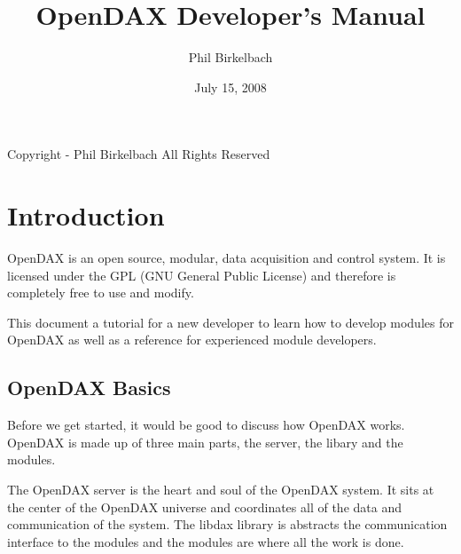 \documentclass[10pt,letterpaper]{report}
\title{OpenDAX Developer's Manual}
\date{July 15, 2008}
\author{Phil Birkelbach}
\begin{document}
\begin{titlepage}
\maketitle

\begin{flushleft}
Copyright  - Phil Birkelbach\linebreak
All Rights Reserved
\end{flushleft}

\end{titlepage}
\tableofcontents
\newpage

\chapter{Introduction}
OpenDAX is an open source, modular, data acquisition and control system. It is licensed under the GPL (GNU General Public License) and therefore is completely free to use and modify.

This document a tutorial for a new developer to learn how to develop modules for OpenDAX as well as a reference for experienced module developers.




\section{OpenDAX Basics}
Before we get started, it would be good to discuss how OpenDAX works.  OpenDAX is made up of three main parts, the server, the libary and the modules.

The OpenDAX server is the heart and soul of the OpenDAX system.  It sits at the center of the OpenDAX universe and coordinates all of the data and communication of the system.  The libdax library is abstracts the communication interface to the modules and the modules are where all the work is done.
\end{document}
